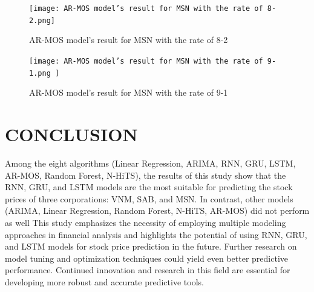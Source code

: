 \documentclass{ieeeojies}
\begin{document}
    \begin{figure}[H]
    \begin{minipage}{0.23\textwidth}
    \centering
    \texttt{[image: AR-MOS model’s result for MSN with the rate of 8-2.png]}
    \caption{AR-MOS model’s result for MSN with the rate of 8-2}
    \end{minipage}
    \hfill
    \begin{minipage}{0.23\textwidth}
    \centering
    \texttt{[image: AR-MOS model’s result for MSN with the rate of 9-1.png ]}
    \caption{AR-MOS model’s result for MSN with the rate of 9-1}
    \end{minipage}
    \end{figure}
   \section{CONCLUSION}
Among the eight algorithms (Linear Regression, ARIMA, RNN, GRU, LSTM, AR-MOS, Random Forest, N-HiTS), the results of this study show that the RNN, GRU, and LSTM models are the most suitable for predicting the stock prices of three corporations: VNM, SAB, and MSN. In contrast, other models (ARIMA, Linear Regression, Random Forest, N-HiTS, AR-MOS) did not perform as well This study emphasizes the necessity of employing multiple modeling approaches in financial analysis and highlights the potential of using RNN, GRU, and LSTM models for stock price prediction in the future. Further research on model tuning and optimization techniques could yield even better predictive performance. Continued innovation and research in this field are essential for developing more robust and accurate predictive tools.
\end{document}
